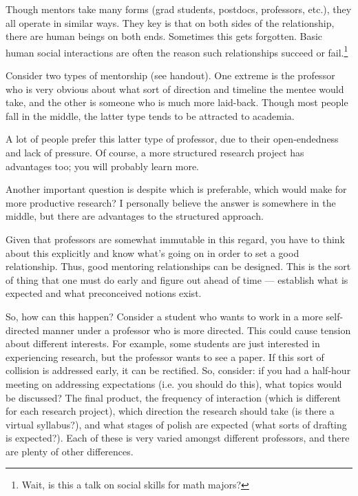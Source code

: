 %
Though mentors take many forms (grad students, postdocs, professors, etc.), they all operate in similar ways. They key is that on both sides of the relationship, there are human beings on both ends. Sometimes this gets forgotten. Basic human social interactions are often the reason such relationships succeed or fail.\footnote{Wait, is this a talk on social skills for math majors?}

Consider two types of mentorship (see handout). One extreme is the professor who is very obvious about what sort of direction and timeline the mentee would take, and the other is someone who is much more laid-back. Though most people fall in the middle, the latter type tends to be attracted to academia.

A lot of people prefer this latter type of professor, due to their open-endedness and lack of pressure. Of course, a more structured research project has advantages too; you will probably learn more.

Another important question is despite which is preferable, which would make for more productive research? I personally believe the answer is somewhere in the middle, but there are advantages to the structured approach.

Given that professors are somewhat immutable in this regard, you have to think about this explicitly and know what's going on in order to set a good relationship. Thus, good mentoring relationships can be designed. This is the sort of thing that one must do early and figure out ahead of time --- establish what is expected and what preconceived notions exist.

So, how can this happen? Consider a student who wants to work in a more self-directed manner under a professor who is more directed. This could cause tension about different interests. For example, some students are just interested in experiencing research, but the professor wants to see a paper. If this sort of collision is addressed early, it can be rectified. So, consider: if you had a half-hour meeting on addressing expectations (i.e. you should do this), what topics would be discussed? The final product, the frequency of interaction (which is different for each research project), which direction the research should take (is there a virtual syllabus?), and what stages of polish are expected (what sorts of drafting is expected?). Each of these is very varied amongst different professors, and there are plenty of other differences.

